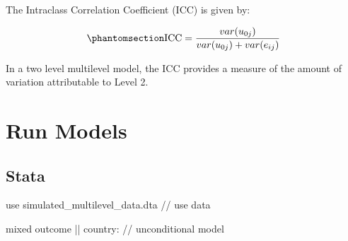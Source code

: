 \documentclass[
  letterpaper,
  DIV=11,
  numbers=noendperiod]{scrreprt}
\newenvironment{Shaded}{\begin{snugshade}}{\end{snugshade}}
\newcommand{\CommentTok}[1]{\textcolor[rgb]{0.37,0.37,0.37}{#1}}
\newcommand{\KeywordTok}[1]{\textcolor[rgb]{0.00,0.23,0.31}{#1}}
\newcommand{\NormalTok}[1]{\textcolor[rgb]{0.00,0.23,0.31}{#1}}
\begin{document}
The Intraclass Correlation Coefficient (ICC) is given by:

\begin{equation}\phantomsection\label{eq-ICCunconditional}{\text{ICC} = \frac{var(u_{0j})}{var(u_{0j}) + var(e_{ij})}}\end{equation}

In a two level multilevel model, the ICC provides a measure of the
amount of variation attributable to Level 2.

\section{Run Models}\label{run-models}

\subsection{Stata}

\begin{Shaded}
\begin{Highlighting}[]

\KeywordTok{use}\NormalTok{ simulated\_multilevel\_data.dta }\CommentTok{// use data}
\end{Highlighting}
\end{Shaded}

\begin{Shaded}
\begin{Highlighting}[]

\NormalTok{mixed outcome || country: }\CommentTok{// unconditional model}
  
\end{Highlighting}
\end{Shaded}
\end{document}
